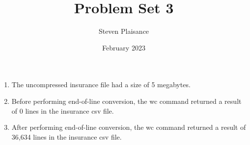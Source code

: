 \documentclass{article}
\title{Problem Set 3}
\author{Steven Plaisance}
\date{February 2023}
\begin{document}
\maketitle

\begin{enumerate}
  \item The uncompressed insurance file had a size of 5 megabytes.
  \item Before performing end-of-line conversion, the wc command returned a result of 0 lines in the insurance csv file. 
  \item After performing end-of-line conversion, the wc command returned a result of 36,634 lines in the insurance csv file. 
\end{enumerate}
\end{document}
